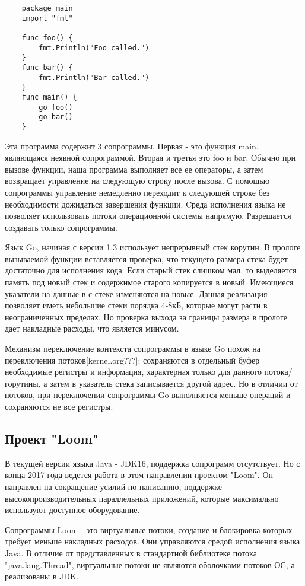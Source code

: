 	\begin{lstlisting}
	package main
	import "fmt"
	
	func foo() {
		fmt.Println("Foo called.")
	}
	func bar() {
		fmt.Println("Bar called.")
	}
	func main() {
		go foo()
		go bar()
	}

	\end{lstlisting}
		
	Эта программа содержит 3 сопрограммы. Первая - это функция main, являющаяся
	неявной сопрограммой. Вторая и третья это foo и bar. Обычно при вызове функции, наша программа 
	выполняет все ее операторы, а затем возвращает управление на следующую строку после вызова. 
	С помощью сопрограммы управление немедленно переходит к следующей строке без необходимости дожидаться завершения функции. Cреда исполнения языка не позволяет использовать потоки операционной системы
	напрямую. Разрешается создавать только сопрограммы.
	\par
	Язык Go, начиная с версии 1.3 использует непрерывный стек корутин. В прологе вызываемой функции вставляется проверка,
	что текущего размера стека будет достаточно для исполнения кода. Если старый стек слишком мал,
	то выделяется память под новый стек и содержимое старого копируется в новый. Имеющиеся указатели на
	данные в с стеке изменяются на новые. Данная реализация позволяет иметь небольшие стеки порядка 4-8кБ, которые
	могут расти в неограниченных пределах. Но проверка выхода за границы размера в прологе дает накладные расходы,
	что является минусом.
	\par 
	Механизм переключение контекста сопрограммы в языке Go похож на переключения потоков[kernel.org???]:
	сохраняются в отдельный буфер необходимые регистры и информация, характерная только для данного
	потока/горутины, а затем в указатель стека записывается другой адрес. Но в отличии от потоков, 
	при переключении сопрограммы Go выполняется меньше операций и сохраняются не все регистры\cite{go-context}.
	
	\subsection{Проект "Loom"}
	В текущей версии языка Java - JDK16, поддержка сопрограмм отсутствует. Но с конца 2017 года ведется 
	работа в этом направлении проектом "Loom". Он направлен на сокращение усилий по написанию, поддержке
	высокопроизводительных параллельных приложений, которые максимально используют доступное оборудование\cite{loom-main}.
	\par
	Сопрограммы Loom - это виртуальные потоки, создание и блокировка которых требует меньше накладных расходов\cite{loom-main}. Они управляются средой исполнения языка Java. 
	В отличие от представленных в стандартной библиотеке потока "java.lang.Thread", виртуальные потоки не являются
	оболочками потоков ОС, а реализованы в JDK.
	
